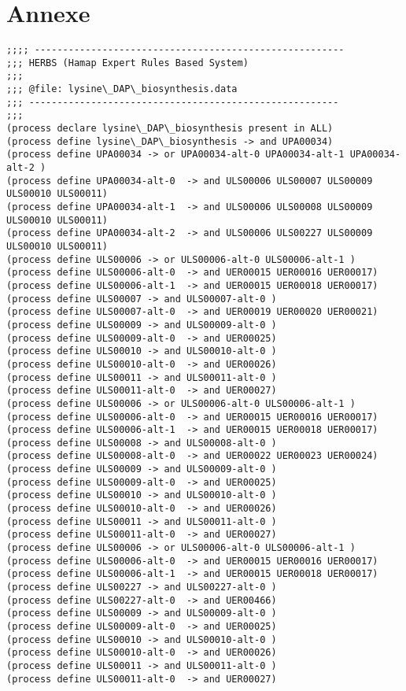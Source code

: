 \chapter{Annexe}

\begin{lstlisting}[basicstyle=\tiny\normalfont\ttfamily,caption=data/processes/lysine\_DAP\_biosynthesis.data]
;;;; -------------------------------------------------------
;;; HERBS (Hamap Expert Rules Based System)
;;;
;;; @file: lysine\_DAP\_biosynthesis.data
;;; -------------------------------------------------------
;;;
(process declare lysine\_DAP\_biosynthesis present in ALL)
(process define lysine\_DAP\_biosynthesis -> and UPA00034)
(process define UPA00034 -> or UPA00034-alt-0 UPA00034-alt-1 UPA00034-alt-2 )
(process define UPA00034-alt-0  -> and ULS00006 ULS00007 ULS00009 ULS00010 ULS00011)
(process define UPA00034-alt-1  -> and ULS00006 ULS00008 ULS00009 ULS00010 ULS00011)
(process define UPA00034-alt-2  -> and ULS00006 ULS00227 ULS00009 ULS00010 ULS00011)
(process define ULS00006 -> or ULS00006-alt-0 ULS00006-alt-1 )
(process define ULS00006-alt-0  -> and UER00015 UER00016 UER00017)
(process define ULS00006-alt-1  -> and UER00015 UER00018 UER00017)
(process define ULS00007 -> and ULS00007-alt-0 )
(process define ULS00007-alt-0  -> and UER00019 UER00020 UER00021)
(process define ULS00009 -> and ULS00009-alt-0 )
(process define ULS00009-alt-0  -> and UER00025)
(process define ULS00010 -> and ULS00010-alt-0 )
(process define ULS00010-alt-0  -> and UER00026)
(process define ULS00011 -> and ULS00011-alt-0 )
(process define ULS00011-alt-0  -> and UER00027)
(process define ULS00006 -> or ULS00006-alt-0 ULS00006-alt-1 )
(process define ULS00006-alt-0  -> and UER00015 UER00016 UER00017)
(process define ULS00006-alt-1  -> and UER00015 UER00018 UER00017)
(process define ULS00008 -> and ULS00008-alt-0 )
(process define ULS00008-alt-0  -> and UER00022 UER00023 UER00024)
(process define ULS00009 -> and ULS00009-alt-0 )
(process define ULS00009-alt-0  -> and UER00025)
(process define ULS00010 -> and ULS00010-alt-0 )
(process define ULS00010-alt-0  -> and UER00026)
(process define ULS00011 -> and ULS00011-alt-0 )
(process define ULS00011-alt-0  -> and UER00027)
(process define ULS00006 -> or ULS00006-alt-0 ULS00006-alt-1 )
(process define ULS00006-alt-0  -> and UER00015 UER00016 UER00017)
(process define ULS00006-alt-1  -> and UER00015 UER00018 UER00017)
(process define ULS00227 -> and ULS00227-alt-0 )
(process define ULS00227-alt-0  -> and UER00466)
(process define ULS00009 -> and ULS00009-alt-0 )
(process define ULS00009-alt-0  -> and UER00025)
(process define ULS00010 -> and ULS00010-alt-0 )
(process define ULS00010-alt-0  -> and UER00026)
(process define ULS00011 -> and ULS00011-alt-0 )
(process define ULS00011-alt-0  -> and UER00027)
\end{lstlisting}
